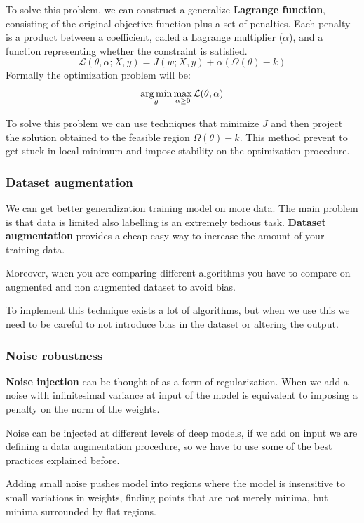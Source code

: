 To solve this problem, we can construct a generalize \textbf{Lagrange function},
consisting of the original objective function plus a set of penalties. Each
penalty is a product between a coefficient, called a Lagrange multiplier ($\alpha$),
and a function representing whether the constraint is satisfied.
\begin{equation}
    \mathcal{L}(\theta, \alpha; X,y) = J(w;X,y)+ \alpha(\Omega(\theta)-k)
\end{equation}
Formally the optimization problem will be:
\begin{equation}
    \operatorname*{arg\,min}_\theta \max_{\alpha \geq 0} \mathcal{L}(\theta, \alpha)
\end{equation}

To solve this problem we can use techniques that minimize $J$ and then project
the solution obtained to the feasible region $\Omega(\theta) - k$. This method
prevent to get stuck in local minimum and impose stability on the optimization
procedure.
\subsubsection{Dataset augmentation}
We can get better generalization training model on more data. The main problem is
that data is limited also labelling is an extremely tedious task. \textbf{Dataset
    augmentation} provides a cheap easy way to increase the amount of your
training data.

Moreover, when you are comparing different algorithms you have to compare on
augmented and non augmented dataset to avoid bias.

To implement this technique exists a lot of algorithms, but when we use this
we need to be careful to not introduce bias in the dataset or altering the output.
\subsubsection{Noise robustness}
\textbf{Noise injection} can be thought of as a form of regularization. When we
add a noise with infinitesimal variance at input of the model is equivalent to
imposing a penalty on the norm of the weights.

Noise can be injected at different levels of deep models, if we add on input we
are defining a data augmentation procedure, so we have to use some of the best
practices explained before.

Adding small noise pushes model into regions where the model is insensitive to
small variations in weights, finding points that are not merely minima, but
minima surrounded by flat regions.

